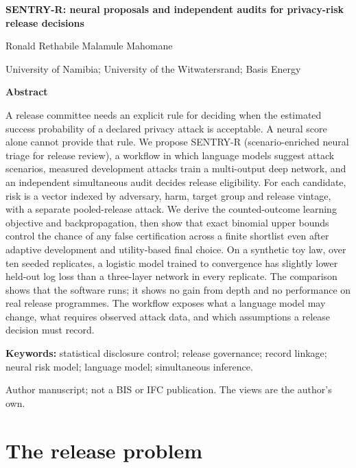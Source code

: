 \documentclass[10pt,a4paper]{article}
\theoremstyle{plain}
\begin{document}
\vspace*{15mm}
{\color{headcolor}\bfseries\LARGE SENTRY-R: neural proposals and independent audits for privacy-risk release decisions\par}
\vspace{12mm}
{\normalsize Ronald Rethabile Malamule Mahomane\par}
{\small University of Namibia; University of the Witwatersrand; Basis Energy\par}
\vspace{9mm}
{\color{headcolor}\bfseries Abstract\par}
\smallskip
A release committee needs an explicit rule for deciding when the estimated
success probability of a declared privacy attack is acceptable. A neural score
alone cannot provide that rule. We propose SENTRY-R (scenario-enriched neural
triage for release review), a workflow in which language models suggest attack
scenarios, measured
development attacks train a multi-output deep network, and an independent
simultaneous audit decides release eligibility. For each candidate, risk is a
vector indexed by adversary, harm, target group and release vintage, with a
separate pooled-release attack. We derive the counted-outcome learning objective
and backpropagation, then show that exact binomial upper bounds control the
chance of any false certification across a finite shortlist even after
adaptive development and utility-based final choice. On a synthetic toy law,
over ten seeded replicates, a logistic model trained to convergence has
slightly lower held-out log loss than a three-layer network in every
replicate. The comparison shows that the software runs; it shows no gain from
depth and no performance on real release programmes. The workflow exposes what a language
model may change, what requires observed attack data, and which assumptions a
release decision must record.

{\small\textbf{Keywords:} statistical disclosure control; release governance;
record linkage; neural risk model; language model; simultaneous inference.\par}
\vspace{5mm}
{\scriptsize\color{notegray}Author manuscript; not a BIS or IFC publication.
The views are the author's own.\par}

\section{The release problem}
\end{document}
